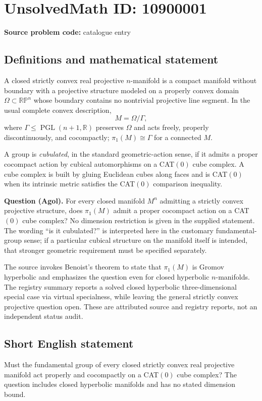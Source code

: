 \documentclass[11pt]{article}
\newcommand{\R}{\mathbb{R}}
\begin{document}
\section*{UnsolvedMath ID: 10900001}
\textbf{Source problem code:} catalogue entry
\subsection{Definitions and mathematical statement}
A closed strictly convex real projective $n$-manifold is a compact manifold without boundary with a projective structure modeled on a properly convex domain $\Omega\subset\mathbb{RP}^{n}$ whose boundary contains no nontrivial projective line segment. In the usual complete convex description,
\[
 M=\Omega/\Gamma,
\]
where $\Gamma\le\operatorname{PGL}(n+1,\R)$ preserves $\Omega$ and acts freely, properly discontinuously, and cocompactly; $\pi_1(M)\cong\Gamma$ for a connected $M$.

A group is \emph{cubulated}, in the standard geometric-action sense, if it admits a proper cocompact action by cubical automorphisms on a CAT$(0)$ cube complex. A cube complex is built by gluing Euclidean cubes along faces and is CAT$(0)$ when its intrinsic metric satisfies the CAT$(0)$ comparison inequality.

\textbf{Question (Agol).} For every closed manifold $M^n$ admitting a strictly convex projective structure, does $\pi_1(M)$ admit a proper cocompact action on a CAT$(0)$ cube complex? No dimension restriction is given in the supplied statement. The wording ``is it cubulated?'' is interpreted here in the customary fundamental-group sense; if a particular cubical structure on the manifold itself is intended, that stronger geometric requirement must be specified separately.

The source invokes Benoist's theorem to state that $\pi_1(M)$ is Gromov hyperbolic and emphasizes the question even for closed hyperbolic $n$-manifolds. The registry summary reports a solved closed hyperbolic three-dimensional special case via virtual specialness, while leaving the general strictly convex projective question open. These are attributed source and registry reports, not an independent status audit.
\subsection{Short English statement}
Must the fundamental group of every closed strictly convex real projective manifold act properly and cocompactly on a CAT$(0)$ cube complex? The question includes closed hyperbolic manifolds and has no stated dimension bound.
\end{document}
